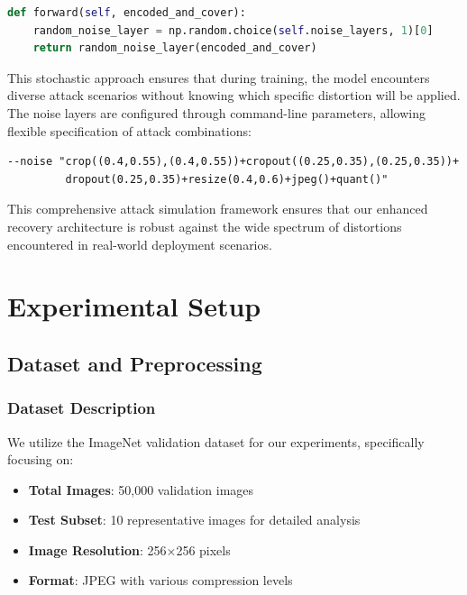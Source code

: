 \documentclass[12pt,a4paper]{report}
\begin{document}
\begin{lstlisting}[language=Python, caption=Random Attack Selection]
def forward(self, encoded_and_cover):
    random_noise_layer = np.random.choice(self.noise_layers, 1)[0]
    return random_noise_layer(encoded_and_cover)
\end{lstlisting}

This stochastic approach ensures that during training, the model encounters diverse attack scenarios without knowing which specific distortion will be applied. The noise layers are configured through command-line parameters, allowing flexible specification of attack combinations:

\begin{verbatim}
--noise "crop((0.4,0.55),(0.4,0.55))+cropout((0.25,0.35),(0.25,0.35))+
         dropout(0.25,0.35)+resize(0.4,0.6)+jpeg()+quant()"
\end{verbatim}

This comprehensive attack simulation framework ensures that our enhanced recovery architecture is robust against the wide spectrum of distortions encountered in real-world deployment scenarios.

\chapter{Experimental Setup}
\label{ch:experimental_setup}

\section{Dataset and Preprocessing}

\subsection{Dataset Description}

We utilize the ImageNet validation dataset for our experiments, specifically focusing on:

\begin{itemize}
    \item \textbf{Total Images}: 50,000 validation images
    \item \textbf{Test Subset}: 10 representative images for detailed analysis
    \item \textbf{Image Resolution}: 256×256 pixels
    \item \textbf{Format}: JPEG with various compression levels
\end{itemize}
\end{document}
